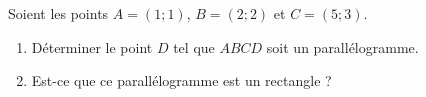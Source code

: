 
\begin{exercice}\label{exosmath-0027}

    Soient les points \( A=(1;1)\), \( B=(2;2)\) et \( C=(5;3)\). 
    \begin{enumerate}
        \item
            Déterminer le point \( D\) tel que \( ABCD\) soit un parallélogramme.
        \item
            Est-ce que ce parallélogramme est un rectangle ?
    \end{enumerate}

\end{exercice}
